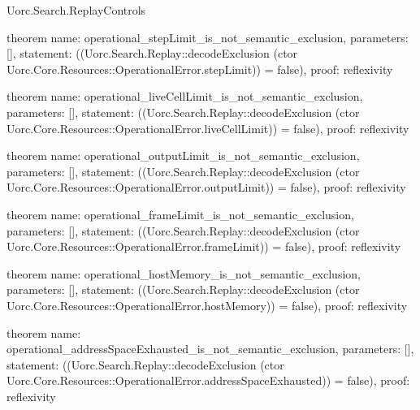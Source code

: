\begin{lexlean}{Uorc.Search.ReplayControls}
\begin{semanticmodule}
theorem{
  name: operational_stepLimit_is_not_semantic_exclusion,
  parameters: [],
  statement: ((Uorc.Search.Replay::decodeExclusion (ctor Uorc.Core.Resources::OperationalError.stepLimit)) = false),
  proof: reflexivity{}
}

theorem{
  name: operational_liveCellLimit_is_not_semantic_exclusion,
  parameters: [],
  statement: ((Uorc.Search.Replay::decodeExclusion (ctor Uorc.Core.Resources::OperationalError.liveCellLimit)) = false),
  proof: reflexivity{}
}

theorem{
  name: operational_outputLimit_is_not_semantic_exclusion,
  parameters: [],
  statement: ((Uorc.Search.Replay::decodeExclusion (ctor Uorc.Core.Resources::OperationalError.outputLimit)) = false),
  proof: reflexivity{}
}

theorem{
  name: operational_frameLimit_is_not_semantic_exclusion,
  parameters: [],
  statement: ((Uorc.Search.Replay::decodeExclusion (ctor Uorc.Core.Resources::OperationalError.frameLimit)) = false),
  proof: reflexivity{}
}

theorem{
  name: operational_hostMemory_is_not_semantic_exclusion,
  parameters: [],
  statement: ((Uorc.Search.Replay::decodeExclusion (ctor Uorc.Core.Resources::OperationalError.hostMemory)) = false),
  proof: reflexivity{}
}

theorem{
  name: operational_addressSpaceExhausted_is_not_semantic_exclusion,
  parameters: [],
  statement: ((Uorc.Search.Replay::decodeExclusion (ctor Uorc.Core.Resources::OperationalError.addressSpaceExhausted)) = false),
  proof: reflexivity{}
}


\end{semanticmodule}
\end{lexlean}
